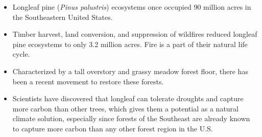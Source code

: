 \documentclass[oneside,a4paper,11pt,explicit]{book}
\begin{document}
\begin{tcolorbox}[colback=yellow!5!white,colframe=IceCreamLeaf,title=\textbf{Southern Pine Forests}]
\begin{multicols}{2}
	\columnbreak
		\begin{itemize}
			\item Longleaf pine (\textit{Pinus palustris}) ecosystems once occupied 90 million acres in the Southeastern United States.
			\item Timber harvest, land conversion, and suppression of wildfires reduced longleaf pine ecosystems to only 3.2 million acres. Fire is a part of their natural life cycle.
			\item Characterized by a tall overstory and grassy meadow forest floor, there has been a recent movement to restore these forests.
			\item Scientists have discovered that longleaf can tolerate droughts and capture more carbon than other trees, which gives them a potential as a natural climate solution, especially since forests of the Southeast are already known to capture more carbon than any other forest region in the U.S.
		\end{itemize}
	\end{multicols}
\end{tcolorbox}
\end{document}
